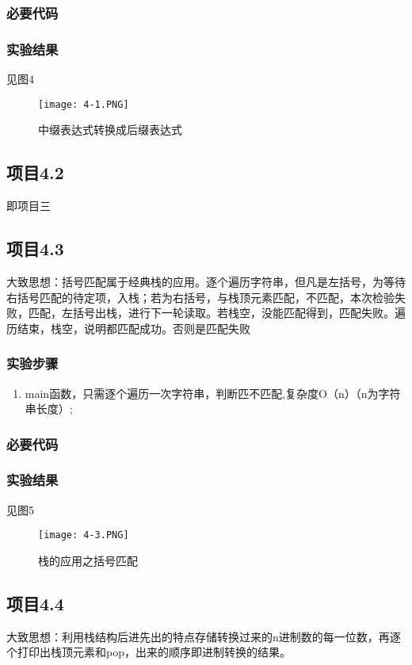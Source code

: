\subsubsection{必要代码}

\subsubsection{实验结果}见图4
	\begin{figure}[!bthp]
	\centering
        \texttt{[image: 4-1.PNG]}
        \caption{中缀表达式转换成后缀表达式}
      \end{figure}

\subsection{项目4.2}
即项目三


\subsection{项目4.3}
大致思想：括号匹配属于经典栈的应用。逐个遍历字符串，但凡是左括号，为等待右括号匹配的待定项，入栈；若为右括号，与栈顶元素匹配，不匹配，本次检验失败，匹配，左括号出栈，进行下一轮读取。若栈空，没能匹配得到，匹配失败。遍历结束，栈空，说明都匹配成功。否则是匹配失败
\subsubsection{实验步骤}
\begin{enumerate}
\item main函数，只需逐个遍历一次字符串，判断匹不匹配,复杂度O（n）（n为字符串长度）;
\end{enumerate}
\subsubsection{必要代码}

\subsubsection{实验结果}见图5     
	\begin{figure}[!bthp]
	\centering
        \texttt{[image: 4-3.PNG]}
        \caption{栈的应用之括号匹配}
      \end{figure}

\subsection{项目4.4}
大致思想：利用栈结构后进先出的特点存储转换过来的n进制数的每一位数，再逐个打印出栈顶元素和pop，出来的顺序即进制转换的结果。
